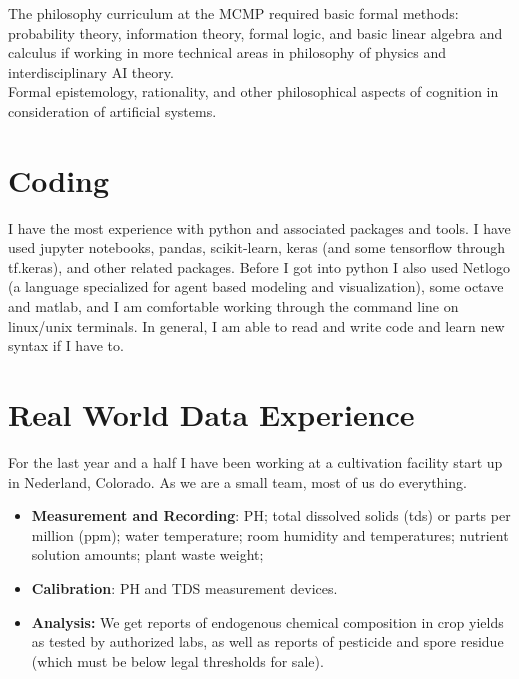 \documentclass[11pt, oneside]{article}   	%
\begin{document}
\noindent The philosophy curriculum at the MCMP required basic formal methods: probability theory, information theory, formal logic, and basic linear algebra and calculus if working in more technical areas in philosophy of physics and interdisciplinary AI theory.  \\

\noindent Formal epistemology, rationality, and other philosophical aspects of cognition in consideration of artificial systems. \\




\section{Coding}

I have the most experience with python and associated packages and tools.  I have used jupyter notebooks, pandas, scikit-learn, keras (and some tensorflow through tf.keras), and other related packages.  Before I got into python I also used Netlogo (a language specialized for agent based modeling and visualization), some octave and matlab, and I am comfortable working through the command line on linux/unix terminals.  In general, I am able to read and write code and learn new syntax if I have to.  

\section{Real World Data Experience}

For the last year and a half I have been working at a cultivation facility start up in Nederland, Colorado.  As we are a small team, most of us do everything.

\begin{multicols}{2}
\begin{itemize}
    \item \textbf{Measurement and Recording}: PH; total dissolved solids (tds) or parts per million (ppm); water temperature; room humidity and temperatures; nutrient solution amounts; plant waste weight; 
    \item \textbf{Calibration}: PH and TDS measurement devices.
    \item \textbf{Analysis:} We get reports of endogenous chemical composition in crop yields as tested by authorized labs, as well as reports of pesticide and spore residue (which must be below legal thresholds for sale).
\end{itemize}
\end{multicols}
\end{document}
